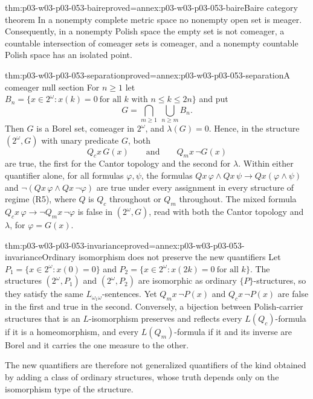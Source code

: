 \begin{hblemma}{thm:p03-w03-p03-053-baire}{proved=annex:p03-w03-p03-053-baire}{Baire category theorem}
In a nonempty complete metric space no nonempty open set is meager.
Consequently, in a nonempty Polish space the empty set is not comeager,
a countable intersection of comeager sets is comeager, and a nonempty
countable Polish space has an isolated point.
\end{hblemma}

\begin{hbtheorem}{thm:p03-w03-p03-053-separation}{proved=annex:p03-w03-p03-053-separation}{A comeager null section}
For \(n\ge1\) let
\(B_n=\{x\in2^\omega:x(k)=0\ \text{for all } k \text{ with } n\le k\le2n\}\)
and put
\[
  G=\bigcap_{m\ge1}\ \bigcup_{n\ge m}B_n .
\]
Then \(G\) is a Borel set, comeager in \(2^\omega\), and
\(\lambda(G)=0\). Hence, in the structure \((2^\omega,G)\) with unary
predicate \(G\), both
\[
  Q_cx\,G(x)\qquad\text{and}\qquad Q_mx\,\neg G(x)
\]
are true, the first for the Cantor topology and the second for
\(\lambda\). Within either quantifier alone, for all formulas
\(\varphi,\psi\), the formulas
\(Q x\,\varphi\land Qx\,\psi\to Qx(\varphi\land\psi)\) and
\(\neg(Qx\,\varphi\land Qx\,\neg\varphi)\) are true under every
assignment in every structure of regime (R5), where \(Q\) is \(Q_c\)
throughout or \(Q_m\) throughout. The mixed formula
\(Q_cx\,\varphi\to\neg Q_mx\,\neg\varphi\) is false in
\((2^\omega,G)\), read with both the Cantor topology and \(\lambda\),
for \(\varphi=G(x)\).
\end{hbtheorem}

\begin{hbtheorem}{thm:p03-w03-p03-053-invariance}{proved=annex:p03-w03-p03-053-invariance}{Ordinary isomorphism does not preserve the new quantifiers}
Let \(P_1=\{x\in2^\omega:x(0)=0\}\) and
\(P_2=\{x\in2^\omega:x(2k)=0\ \text{for all } k\}\).
The structures \((2^\omega,P_1)\) and \((2^\omega,P_2)\) are isomorphic
as ordinary \(\{P\}\)-structures, so they satisfy the same
\(L_{\omega_1\omega}\)-sentences. Yet \(Q_mx\,\neg P(x)\) and
\(Q_cx\,\neg P(x)\) are false in the first and true in the second.
Conversely, a bijection between Polish-carrier structures that is an
\(L\)-isomorphism preserves and reflects every \(L(Q_c)\)-formula if it
is a homeomorphism, and every \(L(Q_m)\)-formula if it and its inverse
are Borel and it carries the one measure to the other.
\end{hbtheorem}

The new quantifiers are therefore not generalized quantifiers of the
kind obtained by adding a class of ordinary structures, whose truth
depends only on the isomorphism type of the structure.

